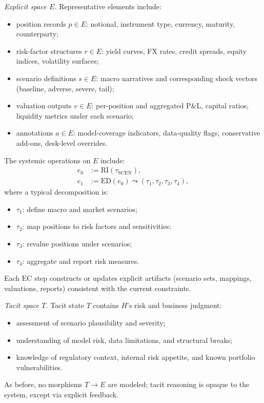 \emph{Explicit space \(E\).}
Representative elements include:
\begin{itemize}
  \item position records \(p \in E\): notional, instrument type, currency, maturity, counterparty;
  \item risk-factor structures \(r \in E\): yield curves, FX rates, credit spreads, equity indices, volatility surfaces;
  \item scenario definitions \(s \in E\): macro narratives and corresponding shock vectors (baseline, adverse, severe, tail);
  \item valuation outputs \(v \in E\): per-position and aggregated P\&L, capital ratios, liquidity metrics under each scenario;
  \item annotations \(a \in E\): model-coverage indicators, data-quality flags, conservative add-ons, desk-level overrides.
\end{itemize}
The systemic operations on \(E\) include:
\begin{align*}
  e_0 &:= \mathrm{RI}(\tau_{\mathrm{SCEN}}), \\
  e_1 &:= \mathrm{ED}(e_0) \leadsto (\tau_1,\tau_2,\tau_3,\tau_4),
\end{align*}
where a typical decomposition is:
\begin{itemize}
  \item \(\tau_1\): define macro and market scenarios;
  \item \(\tau_2\): map positions to risk factors and sensitivities;
  \item \(\tau_3\): revalue positions under scenarios;
  \item \(\tau_4\): aggregate and report risk measures.
\end{itemize}
Each \(\mathrm{EC}\) step constructs or updates explicit artifacts (scenario sets, mappings, valuations, reports) consistent with the current constraints.

\emph{Tacit space \(T\).}
Tacit state \(T\) contains \(H\)'s risk and business judgment:
\begin{itemize}
  \item assessment of scenario plausibility and severity;
  \item understanding of model risk, data limitations, and structural breaks;
  \item knowledge of regulatory context, internal risk appetite, and known portfolio vulnerabilities.
\end{itemize}
As before, no morphisms \(T \to E\) are modeled; tacit reasoning is opaque to the system, except via explicit feedback.

